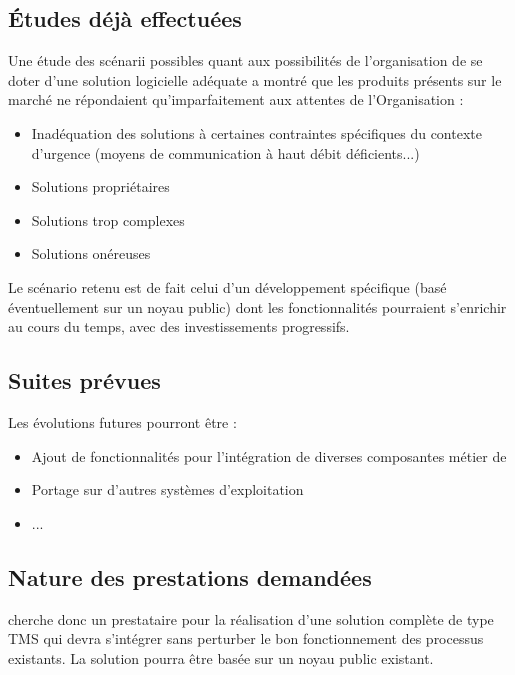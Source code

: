 \subsection{Études déjà effectuées}
Une étude des scénarii possibles quant aux possibilités de l'organisation de se doter d'une solution logicielle adéquate a montré que les produits présents sur le marché ne répondaient qu'imparfaitement aux attentes de l'Organisation :
\begin{itemize}
\item Inadéquation des solutions à certaines contraintes spécifiques du contexte d'urgence (moyens de communication à haut débit déficients...)
\item Solutions propriétaires
\item Solutions trop complexes
\item Solutions onéreuses
\end{itemize}
Le scénario retenu est de fait celui d'un développement spécifique (basé éventuellement sur un noyau public) dont les fonctionnalités pourraient s'enrichir au cours du temps, avec des investissements progressifs.

\subsection{Suites prévues}
Les évolutions futures pourront être :
\begin{itemize}
	\item Ajout de fonctionnalités pour l'intégration de diverses composantes métier de \mo
	\item Portage sur d'autres systèmes d'exploitation
	\item ...
\end{itemize}

\subsection{Nature des prestations demandées}
\mo cherche donc un prestataire pour la réalisation d'une solution complète de type TMS qui devra s'intégrer sans perturber le bon fonctionnement des processus existants. La solution pourra être basée sur un noyau public existant.

